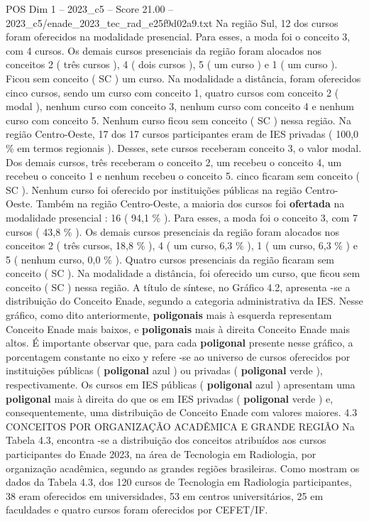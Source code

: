 \begin{textsample}{POS Dim 1 – 2023\_c5 – Score 21.00 – 2023\_c5/enade\_2023\_tec\_rad\_e25f9d02a9.txt}
Na região Sul, 12 dos cursos foram oferecidos na modalidade presencial.
Para esses, a moda foi o conceito 3, com 4 cursos.
Os demais cursos presenciais da região foram alocados nos conceitos 2 ( três cursos ), 4 ( dois cursos ), 5 ( um curso ) e 1 ( um curso ).
Ficou sem conceito ( SC ) um curso.
Na modalidade a distância, foram oferecidos cinco cursos, sendo um curso com conceito 1, quatro cursos com conceito 2 ( modal ), nenhum curso com conceito 3, nenhum curso com conceito 4 e nenhum curso com conceito 5.
Nenhum curso ficou sem conceito ( SC ) nessa região.
Na região Centro-Oeste, 17 dos 17 cursos participantes eram de IES privadas ( 100,0 \% em termos regionais ).
Desses, sete cursos receberam conceito 3, o valor modal.
Dos demais cursos, três receberam o conceito 2, um recebeu o conceito 4, um recebeu o conceito 1 e nenhum recebeu o conceito 5. cinco ficaram sem conceito ( SC ).
Nenhum curso foi oferecido por instituições públicas na região Centro-Oeste.
Também na região Centro-Oeste, a maioria dos cursos foi \textbf{ofertada} na modalidade presencial : 16 ( 94,1 \% ).
Para esses, a moda foi o conceito 3, com 7 cursos ( 43,8 \% ).
Os demais cursos presenciais da região foram alocados nos conceitos 2 ( três cursos, 18,8 \% ), 4 ( um curso, 6,3 \% ), 1 ( um curso, 6,3 \% ) e 5 ( nenhum curso, 0,0 \% ).
Quatro cursos presenciais da região ficaram sem conceito ( SC ).
Na modalidade a distância, foi oferecido um curso, que ficou sem conceito ( SC ) nessa região.
A título de síntese, no Gráfico 4.2, apresenta -se a distribuição do Conceito Enade, segundo a categoria administrativa da IES.
Nesse gráfico, como dito anteriormente, \textbf{poligonais} mais à esquerda representam Conceito Enade mais baixos, e \textbf{poligonais} mais à direita Conceito Enade mais altos.
É importante observar que, para cada \textbf{poligonal} presente nesse gráfico, a porcentagem constante no eixo y refere -se ao universo de cursos oferecidos por instituições públicas ( \textbf{poligonal} azul ) ou privadas ( \textbf{poligonal} verde ), respectivamente.
Os cursos em IES públicas ( \textbf{poligonal} azul ) apresentam uma \textbf{poligonal} mais à direita do que os em IES privadas ( \textbf{poligonal} verde ) e, consequentemente, uma distribuição de Conceito Enade com valores maiores. 4.3 CONCEITOS POR ORGANIZAÇÃO ACADÊMICA E GRANDE REGIÃO Na Tabela 4.3, encontra -se a distribuição dos conceitos atribuídos aos cursos participantes do Enade 2023, na área de Tecnologia em Radiologia, por organização acadêmica, segundo as grandes regiões brasileiras.
Como mostram os dados da Tabela 4.3, dos 120 cursos de Tecnologia em Radiologia participantes, 38 eram oferecidos em universidades, 53 em centros universitários, 25 em faculdades e quatro cursos foram oferecidos por CEFET/IF.

\end{textsample}
